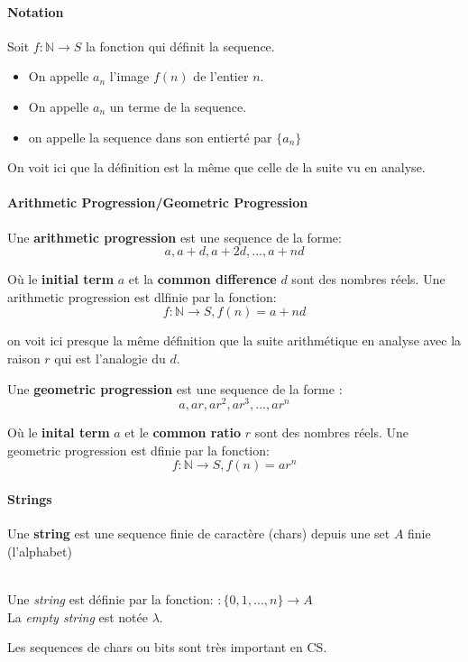 \paragraph{Notation}
Soit $f : \mathbb{N} \to S$ la fonction qui définit la sequence.
\begin{itemize}
    \item On appelle $a_n$ l'image $f(n)$ de l'entier $n$.
    \item On appelle $a_n$ un terme de la sequence.
    \item on appelle la sequence dans son entierté par $\{a_n\}$
\end{itemize}
\begin{framedremark}
    On voit ici que la définition est la même que celle de la suite vu en analyse.
\end{framedremark}

\paragraph{Arithmetic Progression/Geometric Progression}
\begin{definition}
    Une \textbf{arithmetic progression} est une sequence de la forme:
    \[a, a+d, a+2d, ..., a+nd\]
\end{definition}
Où le \textbf{initial term} $a$ et la \textbf{common difference} $d$ sont des nombres réels. Une arithmetic progression est dlfinie par la fonction:
\begin{equation*}
    f:\mathbb{N} \to S, f(n) = a + nd
\end{equation*}
\begin{framedremark}
    on voit ici presque la même définition que la suite arithmétique en analyse avec la raison $r$ qui est l'analogie du $d$.
\end{framedremark}


\begin{definition}
    Une \textbf{geometric progression} est une sequence de la forme :
\[a, ar, ar^2, ar^3, ..., ar^n\]
\end{definition}
Où le \textbf{inital term} $a$ et le \textbf{common ratio} $r$ sont des nombres réels. Une geometric progression est dfinie par la fonction:
\begin{equation*}
    f:\mathbb{N} \to S, f(n) = ar^n
\end{equation*}

\paragraph{Strings}
\begin{definition}
    Une \textbf{string} est une sequence finie de caractère (chars) depuis une set $A$ finie (l'alphabet)
\end{definition}
\\
Une \textit{string} est définie par la fonction: $:\{0, 1, ..., n\} \to A$
\\
La \textit{empty string} est notée $\lambda$.
\begin{framedremark}
    Les sequences de chars ou bits sont très important en CS.
\end{framedremark}

